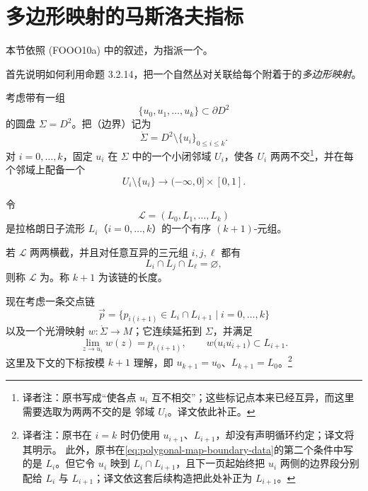 \section{多边形映射的马斯洛夫指标}
\label{sec:maslov-indices-polygonal-maps}

本节依照 (FOOO10a) 中的叙述，为\termPolygonalMap{}指派一个\termTopologicalIndex{}。

首先说明如何利用命题 3.2.14，把一个自然丛对关联给每个附着于\termTransversalLagrangianChain{}的\emph{多边形映射}。

考虑带有一组\termMarkedPoint{}
\[
  \{u_0,u_1,\ldots,u_k\}\subset\partial D^2
\]
的圆盘 $\Sigma=D^2$。把（边界）\termPuncturedDisc{}记为
\[
  \dot\Sigma=D^2\setminus\{u_i\}_{0\le i\le k}.
\]
对 $i=0,\ldots,k$，固定 $u_i$ 在 $\Sigma$ 中的一个小闭邻域
$U_i$，使各 $U_i$ 两两不交\footnote{译者注：原书写成“使各点
$u_i$ 互不相交”；这些标记点本来已经互异，而这里需要选取为两两不交的是
邻域 $U_i$。译文依此补正。}，并在每个邻域上配备一个\termConformalIsomorphism{}
\[
  U_i\setminus\{u_i\}\longrightarrow(-\infty,0]\times[0,1].
\]

令
\[
  \mathcal L=(L_0,L_1,\ldots,L_k)
\]
是拉格朗日子流形 $L_i$（$i=0,\ldots,k$）的一个有序
$(k+1)$-元组。

\begin{definition}
\label{def:transversal-lagrangian-chain}
若 $\mathcal L$ 两两横截，并且对任意互异的三元组 $i,j,\ell$ 都有
\[
  L_i\cap L_j\cap L_\ell=\varnothing,
\]
则称 $\mathcal L$ 为\termTransversalChain{}。称 $k+1$ 为该链的长度。
\end{definition}

现在考虑一条交点链
\[
  \vec p
  =\{p_{i(i+1)}\in L_i\cap L_{i+1}\mid i=0,\ldots,k\}
\]
以及一个光滑映射 $w:\dot\Sigma\to M$；它连续延拓到 $\Sigma$，并满足
\begin{equation}
  \lim_{z\to u_i}w(z)=p_{i(i+1)},
  \qquad
  w\bigl(\overline{u_i u_{i+1}}\bigr)\subset L_{i+1}.
\label{eq:polygonal-map-boundary-data}
\end{equation}
这里及下文的下标按模 $k+1$ 理解，即
$u_{k+1}=u_0$、$L_{k+1}=L_0$。\footnote{译者注：原书在
$i=k$ 时仍使用 $u_{i+1}$、$L_{i+1}$，却没有声明循环约定；译文将其明示。
此外，原书在\eqref{eq:polygonal-map-boundary-data}的第二个条件中写的是
$L_i$。但它令 $u_i$ 映到 $L_i\cap L_{i+1}$，且下一页起始终把 $u_i$
两侧的边界段分别配给 $L_i$ 与 $L_{i+1}$；译文依这套后续构造把此处补正为
$L_{i+1}$。}

